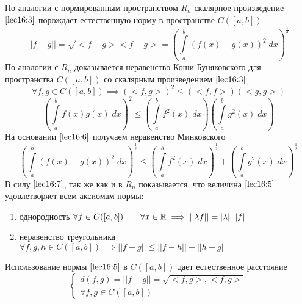 \documentclass[../../main.tex]{subfiles}
\begin{document}
	 По аналогии с нормированным пространством $R_n$ скалярное произведение
	  $\eqref{lec16:3}$ порождает естественную норму в пространстве $C(\left[a,
	   b\right])$
	 \begin{equation}
	 \label{lec16:5}
	 ||f - g|| = \sqrt{<f - g><f - g>} = \left(\int \limits_a^b (f(x) - g(x))^2
	  \; dx\right)^\frac{1}{2}
	 \end{equation}
	 По аналогии с $R_n$ доказывается неравенство Коши-Буняковского для 
	 пространства
	  $C(\left[a, b\right])$ со скалярным произведением $\eqref{lec16:3}$	
	 \[ \forall f, g \in C(\left[a, b\right]) \implies (<f, g>)^2 \leq (<f, 
	 f>)(<g, g>)\]
	 \begin{equation}
	\label{lec16:6}
	 \left(\int\limits_a^bf(x)g(x)\; dx\right)^2 \le \left(\int \limits_a^b
	  f^2(x)\; dx\right)\left(\int \limits_a^b g^2(x)\; dx\right) 
	 \end{equation}
	 На основании $\eqref{lec16:6}$ получаем неравенство Минковского
	 \begin{equation}
	 \label{lec16:7}
	  \left(\int\limits_a^b(f(x) - g(x))^2\; dx\right)^\frac{1}{2} \le \left(\int
	   \limits_a^b f^2(x)\; dx\right)^\frac{1}{2} + \left(\int \limits_a^b 
	   g^2(x)\; dx\right) ^ \frac{1}{2}
	 \end{equation}
	 В силу $\eqref{lec16:7}$, так же как и в $R_n$ показывается, что величина
	  $\eqref{lec16:5}$ удовлетворяет всем аксиомам нормы:
	 \begin{enumerate}
	  \\
	 $\forall f \in C(\left[a, b\right]) \implies ||f|| \geq 0$, причем $||f|| = 
	 0
	  \iff \begin{cases}
	 f(x) = 0\\\forall x \in \left[a, b\right]\\
	 \end{cases}$
	 	\item однородность
	 $\forall f \in C(\left[a, b\right]) \qquad \forall x \in \mathbb{R} \implies 
	 ||\lambda
	  f|| = |\lambda| \ ||f||$\\
	 \item неравенство треугольника
	 $\forall f, g, h \in C(\left[a, b\right]) \implies ||f - g|| \leq ||f - h|| 
	 + ||h - g||$
	 	\end{enumerate}
	 Использование нормы $\eqref{lec16:5}$ в $C(\left[a, b\right])$ дает 
	 естественное расстояние
	 \begin{equation}
	 \label{lec16:8}
	 \begin{cases}
	 d(f, g) = ||f - g|| = \sqrt{<f, g>, <f, g>}\\
	 \forall f, g \in C(\left[a, b\right])
	 \end{cases}
	 \end{equation}
\end{document}

